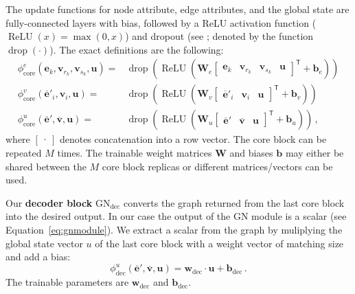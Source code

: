 The update functions for node attribute, edge attributes, and the global state are fully-connected layers with bias, followed by a ReLU activation function ($\operatorname{ReLU}(x) = \max(0,x)$) and dropout (see \cite{srivastava2014:dropout}; denoted by the function $\operatorname{drop}(\cdot)$). The exact definitions are the following:
\begin{align}
    \phi^e_\text{core}\left(\bm{e}_k,\bm{v}_{r_k},\bm{v}_{s_k},\bm{u}\right)=&
        \operatorname{drop}\left(\operatorname{ReLU}\left(
            \bm{W}_e\begin{bmatrix}\bm{e}_k & \bm{v}_{r_k} & \bm{v}_{s_k} & \bm{u}\end{bmatrix}^\mathsf{T}+\bm{b}_e
        \right)\right)\\
    \phi^v_\text{core}\left(\bm{\overline{e}}'_i,\bm{v}_i,\bm{u}\right)=&
        \operatorname{drop}\left(\operatorname{ReLU}\left(
            \bm{W}_v\begin{bmatrix}\bm{\overline{e}}'_i & \bm{v}_i & \bm{u}\end{bmatrix}^\mathsf{T}+\bm{b}_v
        \right)\right)\\
    \phi^u_\text{core}\left(\bm{\overline{e}}',\bm{\overline{v}},\bm{u}\right)=&
        \operatorname{drop}\left(\operatorname{ReLU}\left(
            \bm{W}_u\begin{bmatrix}\bm{\overline{e}}' & \bm{\overline{v}} & \bm{u}\end{bmatrix}^\mathsf{T}+\bm{b}_u
        \right)\right)\,,
\end{align}where $\begin{bmatrix}\cdot\end{bmatrix}$ denotes concatenation into a row vector. The core block can be repeated $M$ times. The trainable weight matrices $\bm{W}$ and biases $\bm{b}$ may either be shared between the $M$ core block replicas or different matrices/vectors can be used.

Our \textbf{decoder block} $\text{GN}_\text{dec}$ converts the graph returned from the last core block into the desired output. In our case the output of the GN module is a scalar (see Equation~\ref{eq:gnmodule}). We extract a scalar from the graph by muliplying the global state vector $u$ of the last core block with a weight vector of matching size and add a bias:
\begin{equation}
    \label{eq:dec:nodeupdate}
    \phi^u_\text{dec}\left(\bm{\overline{e}}',\bm{\overline{v}},\bm{u}\right)=\bm{w}_\text{dec}\cdot\bm{u}+\bm{b}_\text{dec}\,.
\end{equation}
The trainable parameters are $\bm{w}_\text{dec}$ and $\bm{b}_\text{dec}$.

